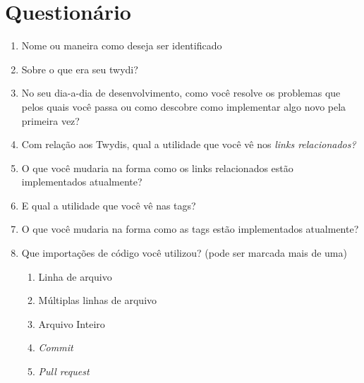 \anexo
\chapter{Questionário}

\begin{enumerate}
  \item \hspace{1pt} Nome ou maneira como deseja ser identificado

  \item \hspace{1pt} Sobre o que era seu twydi?

  \item \hspace{1pt} No seu dia-a-dia de desenvolvimento, como você resolve os problemas que pelos quais você passa ou como descobre como implementar algo novo pela primeira vez?

  \item \hspace{1pt} Com relação aos Twydis, qual a utilidade que você vê nos \textit{links relacionados?}

  \item \hspace{1pt} O que você mudaria na forma como os links relacionados estão implementados atualmente?

  \item \hspace{1pt} E qual a utilidade que você vê nas tags?

  \item \hspace{1pt} O que você mudaria na forma como as tags estão implementados atualmente?

  \item \hspace{1pt} Que importações de código você utilizou? (pode ser marcada mais de uma)
  \begin{enumerate}
    \item \hspace{1pt} Linha de arquivo
    \item \hspace{1pt} Múltiplas linhas de arquivo
    \item \hspace{1pt} Arquivo Inteiro
    \item \hspace{1pt} \textit{Commit}
    \item \hspace{1pt} \textit{Pull request}
  \end{enumerate}


\end{enumerate}
